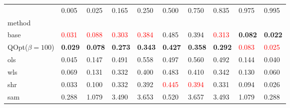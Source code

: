 \begin{tabular}{llllllllll}
\toprule
 & 0.005 & 0.025 & 0.165 & 0.250 & 0.500 & 0.750 & 0.835 & 0.975 & 0.995 \\
method &  &  &  &  &  &  &  &  &  \\
\midrule
base & \textcolor{red}{0.031} & \textcolor{red}{0.088} & \textcolor{red}{0.303} & \textcolor{red}{0.384} & 0.485 & 0.394 & \textcolor{red}{0.313} & \textbf{0.082} & \textbf{0.022} \\
\midrule
QOpt($\beta=100$) & \textbf{0.029} & \textbf{0.078} & \textbf{0.273} & \textbf{0.343} & \textbf{0.427} & \textbf{0.358} & \textbf{0.292} & \textcolor{red}{0.083} & \textcolor{red}{0.025} \\
ols & 0.045 & 0.147 & 0.491 & 0.558 & 0.497 & 0.560 & 0.492 & 0.144 & 0.040 \\
wls & 0.069 & 0.131 & 0.332 & 0.400 & 0.483 & 0.410 & 0.342 & 0.130 & 0.060 \\
shr & 0.033 & 0.100 & 0.332 & 0.392 & \textcolor{red}{0.445} & \textcolor{red}{0.394} & 0.331 & 0.094 & 0.026 \\
sam & 0.288 & 1.079 & 3.490 & 3.653 & 0.520 & 3.657 & 3.493 & 1.079 & 0.288 \\
\bottomrule
\end{tabular}